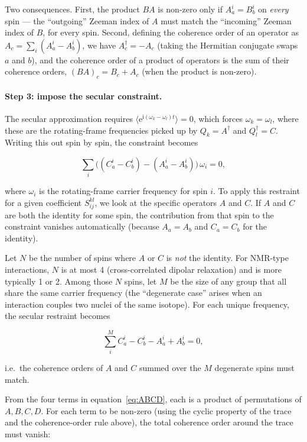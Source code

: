 \documentclass[notitlepage,11pt]{article}
\newcommand{\rmi}{\mathrm{i}}
\newcommand{\rme}{\mathrm{e}}
\begin{document}
Two consequences. First, the product $BA$ is non-zero only if $A_a^i = B_b^i$ on \emph{every} spin — the ``outgoing'' Zeeman index of $A$ must match the ``incoming'' Zeeman index of $B$, for every spin. Second, defining the coherence order of an operator as $A_c=\sum_i (A_a^i - A_b^i)$, we have $A_c^\dagger=-A_c$ (taking the Hermitian conjugate swaps $a$ and $b$), and the coherence order of a product of operators is the sum of their coherence orders, $(BA)_c = B_c+A_c$ (when the product is non-zero).

\paragraph{Step 3: impose the secular constraint.}
The secular approximation requires $\langle\rme^{\rmi(\omega_k-\omega_l)t}\rangle=0$, which forces $\omega_k=\omega_l$, where these are the rotating-frame frequencies picked up by $Q_k=A^\dagger$ and $Q_l^\dagger=C$. Writing this out spin by spin, the constraint becomes

\begin{equation}
 \sum_i \big((C_a^i-C_b^i)-(A_a^i-A_b^i)\big)\,\omega_i = 0,
  \end{equation}

where $\omega_i$ is the rotating-frame carrier frequency for spin $i$. To apply this restraint for a given coefficient $S_{ij}^{kl}$, we look at the specific operators $A$ and $C$. If $A$ and $C$ are both the identity for some spin, the contribution from that spin to the constraint vanishes automatically (because $A_a=A_b$ and $C_a=C_b$ for the identity).

Let $N$ be the number of spins where $A$ or $C$ is \emph{not} the identity. For NMR-type interactions, $N$ is at most 4 (cross-correlated dipolar relaxation) and is more typically 1 or 2. Among those $N$ spins, let $M$ be the size of any group that all share the same carrier frequency (the ``degenerate case'' arises when an interaction couples two nuclei of the same isotope). For each unique frequency, the secular restraint becomes

\begin{equation}
  \sum_i^M C_a^{i}-C_b^{i}-A_a^{i}+A_b^{i} = 0,
  \label{eq:sel}
  \end{equation}
   
i.e.\ the coherence orders of $A$ and $C$ summed over the $M$ degenerate spins must match.

From the four terms in equation~\ref{eq:ABCD}, each is a product of permutations of $A,B,C,D$. For each term to be non-zero (using the cyclic property of the trace and the coherence-order rule above), the total coherence order around the trace must vanish:
\end{document}
